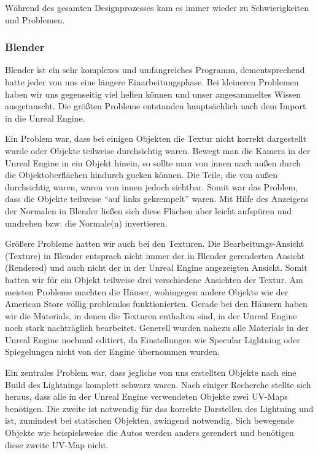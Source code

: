 \documentclass{Bericht}
\begin{document}
		Während des gesamten Designprozesses kam es immer wieder zu Schwierigkeiten und Problemen.
		
		\subsubsection{Blender}
			Blender ist ein sehr komplexes und umfangreiches Programm, dementsprechend hatte jeder von uns eine längere Einarbeitungsphase. Bei kleineren Problemen haben wir uns gegenseitig viel helfen können und unser angesammeltes Wissen ausgetauscht. Die größten Probleme entstanden hauptsächlich nach dem Import in die Unreal Engine. 

			Ein Problem war, dass bei einigen Objekten die Textur nicht korrekt dargestellt wurde oder Objekte teilweise durchsichtig waren. Bewegt man die Kamera in der Unreal Engine in ein Objekt hinein, so sollte man von innen nach außen durch die Objektoberflächen hindurch gucken können. Die Teile, die von außen durchsichtig waren, waren von innen jedoch sichtbar. Somit war das Problem, dass die Objekte teilweise "`auf links gekrempelt"' waren. Mit Hilfe des Anzeigens der Normalen in Blender ließen sich diese Flächen aber leicht aufspüren und umdrehen bzw. die Normale(n) invertieren.
			
			Größere Probleme hatten wir auch bei den Texturen. Die Bearbeitungs-Ansicht (Texture) in Blender entsprach nicht immer der in Blender gerenderten Ansicht (Rendered) und auch nicht der in der Unreal Engine angezeigten Ansicht. Somit hatten wir für ein Objekt teilweise drei verschiedene Ansichten der Textur. Am meisten Probleme machten die Häuser, wohingegen andere Objekte wie der American Store völlig problemlos funktionierten. Gerade bei den Häusern haben wir die Materials, in denen die Texturen enthalten sind, in der Unreal Engine noch stark nachträglich bearbeitet.
			Generell wurden nahezu alle Materials in der Unreal Engine nochmal editiert, da Einstellungen wie Specular Lightning oder Spiegelungen nicht von der Engine übernommen wurden.
			
			Ein zentrales Problem war, dass jegliche von uns erstellten Objekte nach eine Build des Lightnings komplett schwarz waren. Nach einiger Recherche stellte sich heraus, dass alle in der Unreal Engine verwendeten Objekte zwei UV-Maps benötigen. Die zweite ist notwendig für das korrekte Darstellen des Lightning und ist, zumindest bei statischen Objekten, zwingend notwendig. Sich bewegende Objekte wie beispielsweise die Autos werden anders gerendert und benötigen diese zweite UV-Map nicht. 
		
\end{document}
